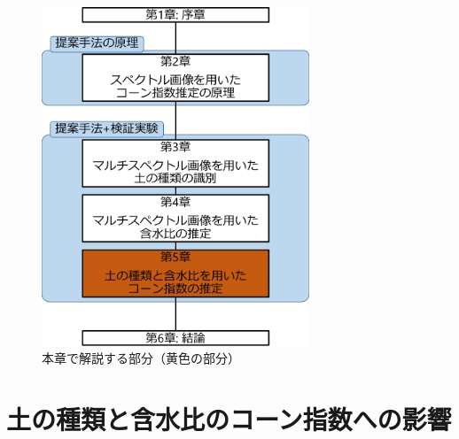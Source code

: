 \begin{figure}[p]
  \begin{center}
  \centering
  \includegraphics[width=8cm]{./Ch5_ConeIndexEstimation/Fig/thesis_constitution_ch5_compressed.pdf}
  \caption{本章で解説する部分（黄色の部分）}\label{fig:thesis_constitution_ch5}
  \end{center}
\end{figure}

\clearpage


\section{土の種類と含水比のコーン指数への影響}
\label{sec:InfluenceOfSoilTypeAndWaterContentToConeIndex}

